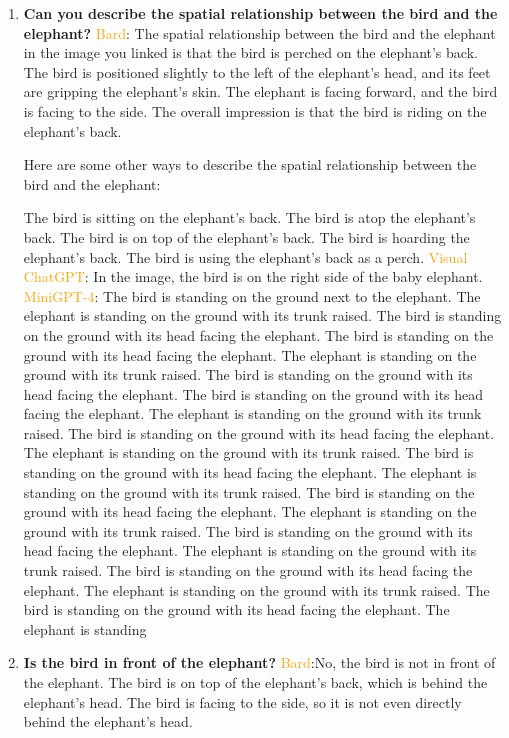     \begin{enumerate}
        \item \textbf{Can you describe the spatial relationship between the bird and the elephant?}
        \subitem \textcolor{orange}{Bard}:
        The spatial relationship between the bird and the elephant in the image you linked is that the bird is perched on the elephant's back. The bird is positioned slightly to the left of the elephant's head, and its feet are gripping the elephant's skin. The elephant is facing forward, and the bird is facing to the side. The overall impression is that the bird is riding on the elephant's back.
        
        Here are some other ways to describe the spatial relationship between the bird and the elephant:
        
        The bird is sitting on the elephant's back.
        The bird is atop the elephant's back.
        The bird is on top of the elephant's back.
        The bird is hoarding the elephant's back.
        The bird is using the elephant's back as a perch.
        \subitem \textcolor{orange}{Visual ChatGPT}: In the image, the bird is on the right side of the baby elephant.
        \subitem \textcolor{orange}{MiniGPT-4}: The bird is standing on the ground next to the elephant. The elephant is standing on the ground with its trunk raised. The bird is standing on the ground with its head facing the elephant. The bird is standing on the ground with its head facing the elephant. The elephant is standing on the ground with its trunk raised. The bird is standing on the ground with its head facing the elephant. The bird is standing on the ground with its head facing the elephant. The elephant is standing on the ground with its trunk raised. The bird is standing on the ground with its head facing the elephant. The elephant is standing on the ground with its trunk raised. The bird is standing on the ground with its head facing the elephant. The elephant is standing on the ground with its trunk raised. The bird is standing on the ground with its head facing the elephant. The elephant is standing on the ground with its trunk raised. The bird is standing on the ground with its head facing the elephant. The elephant is standing on the ground with its trunk raised. The bird is standing on the ground with its head facing the elephant. The elephant is standing on the ground with its trunk raised. The bird is standing on the ground with its head facing the elephant. The elephant is standing
        \item \textbf{Is the bird in front of the elephant?}
        \subitem \textcolor{orange}{Bard}:No, the bird is not in front of the elephant. The bird is on top of the elephant's back, which is behind the elephant's head. The bird is facing to the side, so it is not even directly behind the elephant's head.


\end{enumerate}
